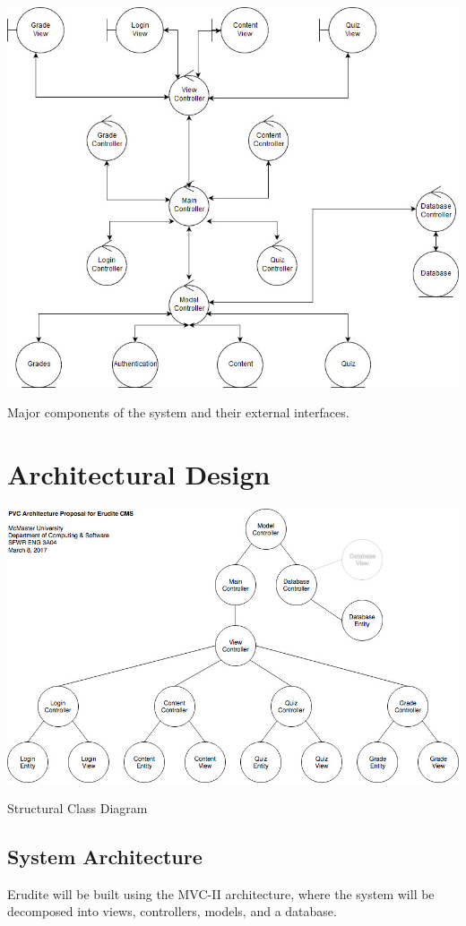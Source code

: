 \documentclass[]{article}
\begin{document}
{
  \centering
    \includegraphics[scale=0.5]{A2_Assets/Analysis_Class_Diagrm_v2.jpg}

  \centerline{Major components of the system and their external interfaces.}
}


\section{Architectural Design}
\label{sec:architectural_design}

{
  \centering
    \includegraphics[scale=0.5]{A2_Assets/Structural_Class_Diagram.jpg}
  \centerline{Structural Class Diagram}
}

\subsection{System Architecture}
\label{sub:system_architecture}
Erudite will be built using the MVC-II architecture, where the system will be decomposed into views, controllers, models, and a database.
\end{document}
